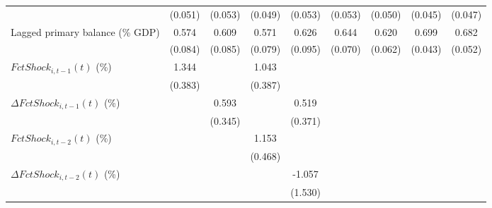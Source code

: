 {\begin{tabular}{l*{8}{c}}
                    &     (0.051)         &     (0.053)         &     (0.049)         &     (0.053)         &     (0.053)         &     (0.050)         &     (0.045)         &     (0.047)         \\
\addlinespace
Lagged primary balance (\% GDP)&       0.574\sym{***}&       0.609\sym{***}&       0.571\sym{***}&       0.626\sym{***}&       0.644\sym{***}&       0.620\sym{***}&       0.699\sym{***}&       0.682\sym{***}\\
                    &     (0.084)         &     (0.085)         &     (0.079)         &     (0.095)         &     (0.070)         &     (0.062)         &     (0.043)         &     (0.052)         \\
\addlinespace
$ FctShock_{i,t-1}(t)$ (\%)&       1.344\sym{***}&                     &       1.043\sym{**} &                     &                     &                     &                     &                     \\
                    &     (0.383)         &                     &     (0.387)         &                     &                     &                     &                     &                     \\
\addlinespace
$ \Delta FctShock_{i,t-1}(t)$ (\%)&                     &       0.593         &                     &       0.519         &                     &                     &                     &                     \\
                    &                     &     (0.345)         &                     &     (0.371)         &                     &                     &                     &                     \\
\addlinespace
$ FctShock_{i,t-2}(t)$ (\%)&                     &                     &       1.153\sym{**} &                     &                     &                     &                     &                     \\
                    &                     &                     &     (0.468)         &                     &                     &                     &                     &                     \\
\addlinespace
$ \Delta FctShock_{i,t-2}(t)$ (\%)&                     &                     &                     &      -1.057         &                     &                     &                     &                     \\
                    &                     &                     &                     &     (1.530)         &                     &                     &                     &                     \\

\end{tabular}}
